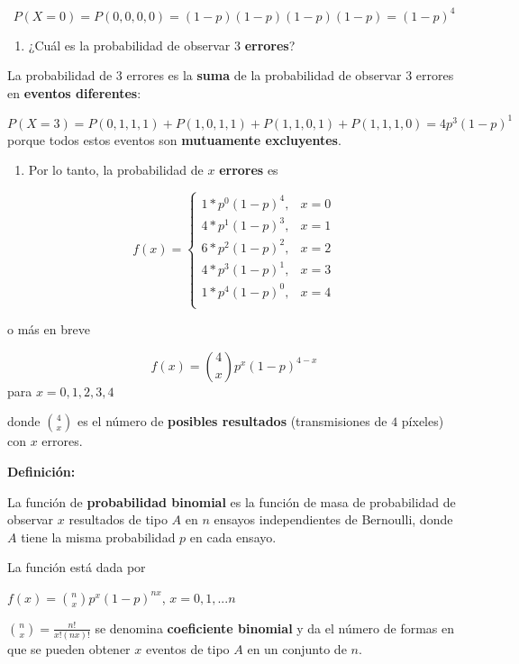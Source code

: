 \documentclass[
]{book}
\providecommand{\tightlist}{%
  \setlength{\itemsep}{0pt}\setlength{\parskip}{0pt}}
\begin{document}
\[P(X=0)=P(0,0,0,0)=(1-p)(1-p)(1-p)(1-p)=(1-p)^4\]

\begin{enumerate}
\def\labelenumi{\arabic{enumi})}
\setcounter{enumi}{2}
\tightlist
\item
  ¿Cuál es la probabilidad de observar \(3\) \textbf{errores}?
\end{enumerate}

La probabilidad de \(3\) errores es la \textbf{suma} de la probabilidad de observar \(3\) errores en \textbf{eventos diferentes}:

\[P(X=3)=P(0,1,1,1)+P(1,0,1,1)+P(1,1,0,1)+P(1,1,1, 0)=4p^3(1-p)^1\]
porque todos estos eventos son \textbf{mutuamente excluyentes}.

\begin{enumerate}
\def\labelenumi{\arabic{enumi})}
\setcounter{enumi}{3}
\tightlist
\item
  Por lo tanto, la probabilidad de \(x\) \textbf{errores} es
\end{enumerate}

\[
    f(x)= 
\begin{cases}
    1*p^0(1-p)^4,&  x=0 \\
    4*p^1(1-p)^3,&  x=1 \\
    6*p^2(1-p)^2,&  x=2 \\
    4*p^3(1-p)^1,&  x=3 \\
    1*p^4(1-p)^0,&  x=4 \\
\end{cases}
\]

o más en breve

\[f(x)=\binom 4 xp^x(1-p)^{4-x}\]
para \(x=0,1,2,3,4\)

donde \(\binom 4 x\) es el número de \textbf{posibles resultados} (transmisiones de \(4\) píxeles) con \(x\) errores.

\textbf{Definición:}

La función de \textbf{probabilidad binomial} es la función de masa de probabilidad de observar \(x\) resultados de tipo \(A\) en \(n\) ensayos independientes de Bernoulli, donde \(A\) tiene la misma probabilidad \(p\) en cada ensayo.

La función está dada por

\(f(x)=\binom nxp^x(1-p)^{nx}\), \(x=0,1,...n\)

\(\binom nx= \frac{n!}{x!(nx)!}\) se denomina \textbf{coeficiente binomial} y da el número de formas en que se pueden obtener \(x\) eventos de tipo \(A\) en un conjunto de \(n\).
\end{document}
